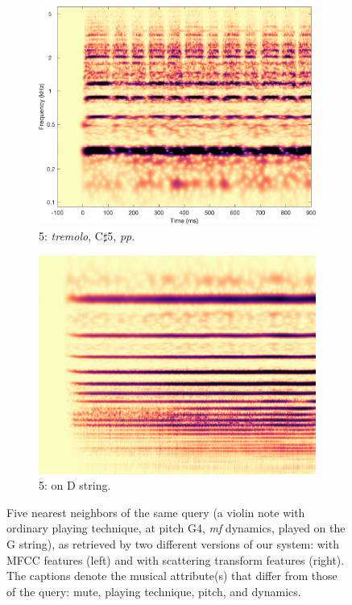 \begin{figure}
        \begin{subfigure}{0.20\textwidth}
                \centering
                \includegraphics[width=\linewidth]{./figs/demo/Vn-trem-Csh5-pp-4c.png}
                \caption*{5: \emph{tremolo}, C$\sharp$5, \emph{pp}.}
                \label{fig:Vn-trem-Csh5-pp-4c}
        \end{subfigure}%
        \begin{subfigure}{0.20\textwidth}
                \centering
                \includegraphics[width=\linewidth]{./figs/demo/Vn-ord-G4-mf-3c.png}
                \caption*{5: on D string.}
                \label{fig:Vn-ord-G4-mf-3c}
        \end{subfigure}%

        \caption{Five nearest neighbors of the same query (a violin note with ordinary playing technique, at pitch G4, \emph{mf} dynamics, played on the G string), as retrieved by two different versions of our system: with MFCC features (left) and with scattering transform features (right). The captions denote the musical attribute(s) that differ from those of the query: mute, playing technique, pitch, and dynamics.
}\label{fig:demo-ordinary}
\end{figure}


